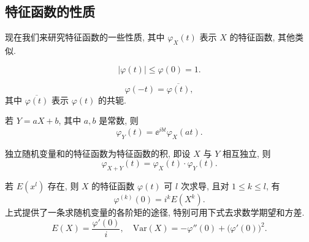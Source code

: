 \subsection{特征函数的性质}

现在我们来研究特征函数的一些性质,
其中 $ \varphi_X (t) $ 表示 $ X $ 的特征函数,
其他类似.

\begin{property}\label{prop:4.1.1}
    \begin{equation}\label{eq:4.1.4}
        \lvert \varphi (t) \rvert \leq \varphi (0) = 1.
    \end{equation}
\end{property}

\begin{property}\label{prop:4.1.2}
    \begin{equation}\label{eq:4.1.5}
        \varphi (-t) = \overline{\varphi (t)},
    \end{equation}
    其中 $ \overline{\varphi (t)} $ 表示 $ \varphi (t) $ 的共轭.
\end{property}

\begin{property}\label{prop:4.1.3}
    若 $ Y = aX + b $, 其中 $ a,b $ 是常数, 则
    \begin{equation}\label{eq:4.1.6}
        \varphi_Y (t) = \ee^{ibt} \varphi_X (at).
    \end{equation}
\end{property}

\begin{property}\label{prop:4.1.4}
    独立随机变量和的特征函数为特征函数的积,
    即设 $ X $ 与 $ Y $ 相互独立, 则
    \begin{equation}\label{eq:4.1.7}
        \varphi_{X+Y} (t) = \varphi_X (t) \cdot \varphi_Y (t).
    \end{equation}
\end{property}

\begin{property}\label{prop:4.1.5}
    若 $ E (x^l) $ 存在,
    则 $ X $ 的特征函数 $ \varphi(t) $ 可 $ l $ 次求导,
    且对 $ 1 \leq k \leq l $, 有
    \begin{equation}\label{eq:4.1.8}
        \varphi^{(k)} (0) = i^k E ( X^k ).
    \end{equation}
    上式提供了一条求随机变量的各阶矩的途径,
    特别可用下式去求数学期望和方差.
    \begin{equation}\label{eq:4.1.9}
        E (X) = \frac{\varphi' (0)}{i}, \quad \mathrm{Var} (X) = - \varphi'' (0) + \bigl( \varphi' (0) \bigr)^2.
    \end{equation}
\end{property}

